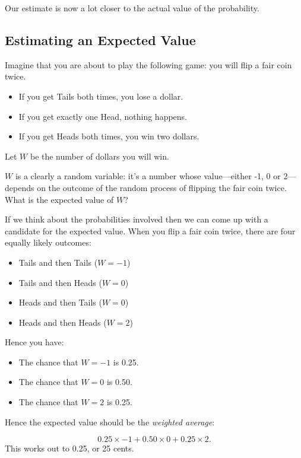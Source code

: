 \documentclass[]{book}
\providecommand{\tightlist}{%
  \setlength{\itemsep}{0pt}\setlength{\parskip}{0pt}}
\theoremstyle{definition}
\theoremstyle{definition}
\theoremstyle{definition}
\theoremstyle{remark}
\begin{document}
{Our estimate is now a lot closer to the actual value of the probability.

\subsection{Estimating an Expected
Value}\label{estimating-an-expected-value}

Imagine that you are about to play the following game: you will flip a
fair coin twice.

\begin{itemize}
\tightlist
\item
  If you get Tails both times, you lose a dollar.
\item
  If you get exactly one Head, nothing happens.
\item
  If you get Heads both times, you win two dollars.
\end{itemize}

Let \(W\) be the number of dollars you will win.

\(W\) is a clearly a random variable: it's a number whose value---either
-1, 0 or 2---depends on the outcome of the random process of flipping
the fair coin twice. What is the expected value of \(W\)?

If we think about the probabilities involved then we can come up with a
candidate for the expected value. When you flip a fair coin twice, there
are four equally likely outcomes:

\begin{itemize}
\tightlist
\item
  Tails and then Tails (\(W = -1\))
\item
  Tails and then Heads (\(W = 0\))
\item
  Heads and then Tails (\(W = 0\))
\item
  Heads and then Heads (\(W = 2\))
\end{itemize}

Hence you have:

\begin{itemize}
\tightlist
\item
  The chance that \(W=-1\) is 0.25.
\item
  The chance that \(W=0\) is 0.50.
\item
  The chance that \(W=2\) is 0.25.
\end{itemize}

Hence the expected value should be the \emph{weighted average}:

\[0.25 \times -1 + 0.50 \times 0 + 0.25 \times 2.\] This works out to
0.25, or 25 cents.

}
\end{document}
